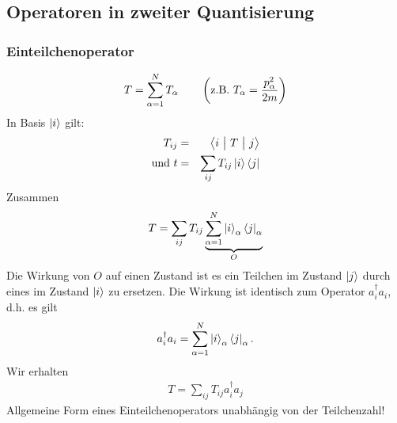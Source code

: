 \subsection{Operatoren in zweiter Quantisierung}
\subsubsection{Einteilchenoperator}
\begin{eqnarray*}
T = \sum \limits_{\alpha = 1}^N T_\alpha \qquad \left(\text{z.B. }T_\alpha = \frac{p_\alpha^2}{2m}\right)
\end{eqnarray*}
In Basis $\left|i\right >$ gilt:
\begin{eqnarray*}
T_{ij} &=& \left < i \ \big| \  T \ \big| \  j \right >\\
\text{und } t &=& \sum \limits_{ij}T_{ij} \left | i \right >\left < j\right|
\end{eqnarray*}
Zusammen
\begin{eqnarray*}
T = \sum \limits _{ij } T_{ij} \underbrace{\sum \limits_{\alpha = 1}^N \left |i \right >_\alpha\left < j\right |_\alpha }_{O}
\end{eqnarray*}
Die Wirkung von $O$ auf einen Zustand ist es ein Teilchen im Zustand $\left |j\right >$ durch eines im Zustand $\left |i \right >$ zu ersetzen. Die Wirkung ist identisch zum Operator $a_i^\dagger a_i$, d.h. es gilt 
\begin{eqnarray*} a_i^\dagger a_i = \sum \limits_{\alpha = 1}^N \left |i\right >_\alpha\left < j\right| _\alpha.\end{eqnarray*}
Wir erhalten
\begin{eqnarray*}
	\boxed{T = \sum \limits_{i j} T_{i j} a_i^\dagger a_j}
\end{eqnarray*}
Allgemeine Form eines Einteilchenoperators unabhängig von der Teilchenzahl!

